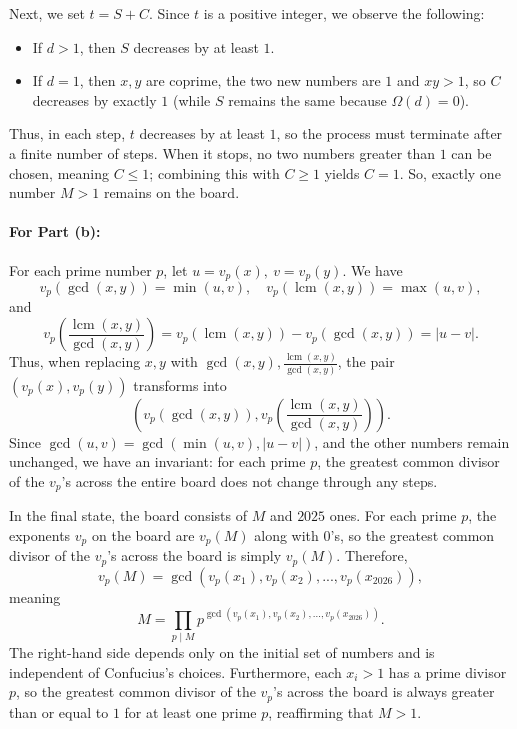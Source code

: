 \documentclass[11pt]{article}
\begin{document}
\medskip
Next, we set $t=S+C$. Since $t$ is a positive integer, we observe the following:
\begin{itemize}
\item If $d>1$, then $S$ decreases by at least $1$.
\item If $d=1$, then $x, y$ are coprime, the two new numbers are $1$ and $xy>1$, so $C$ decreases by exactly $1$ (while $S$ remains the same because $\Omega(d)=0$).
\end{itemize}

Thus, in each step, $t$ decreases by at least $1$, so the process must terminate after a finite number of steps. When it stops, no two numbers greater than $1$ can be chosen, meaning $C\le 1$; combining this with $C\ge 1$ yields $C=1$. So, exactly one number $M>1$ remains on the board.

\paragraph{For Part (b):}
For each prime number $p$, let $u=v_p(x),\ v=v_p(y)$. We have $$v_p(\gcd(x,y))=\min(u,v),\quad v_p(\operatorname{lcm}(x,y))=\max(u,v),$$
and$$v_p\left(\dfrac{\operatorname{lcm}(x,y)}{\gcd(x,y)}\right)=v_p(\operatorname{lcm}(x,y))-v_p(\gcd(x,y))=|u-v|.$$
Thus, when replacing $x, y$ with $\gcd(x,y), \frac{\operatorname{lcm}(x,y)}{\gcd(x,y)}$, the pair $(v_p(x), v_p(y))$ transforms into $$\left(v_p(\gcd(x,y)), v_p\left(\frac{\operatorname{lcm}(x,y)}{\gcd(x,y)}\right)\right).$$ Since $\gcd(u,v)=\gcd(\min(u,v),|u-v|)$, and the other numbers remain unchanged, we have an invariant: for each prime $p$, the greatest common divisor of the $v_p$'s across the entire board does not change through any steps.

\medskip
In the final state, the board consists of $M$ and $2025$ ones. For each prime $p$, the exponents $v_p$ on the board are $v_p(M)$ along with $0$'s, so the greatest common divisor of the $v_p$'s across the board is simply $v_p(M)$. Therefore, $$v_p(M)= \gcd(v_p(x_1),v_p(x_2),...,v_p(x_{2026})),$$ meaning $$M=\prod_{p \mid M} p^{\gcd(v_p(x_1),v_p(x_2),...,v_p(x_{2026}))}.$$ The right-hand side depends only on the initial set of numbers and is independent of Confucius's choices. Furthermore, each $x_i>1$ has a prime divisor $p$, so the greatest common divisor of the $v_p$'s across the board is always greater than or equal to $1$ for at least one prime $p$, reaffirming that $M>1$. 
\newpage
\end{document}
